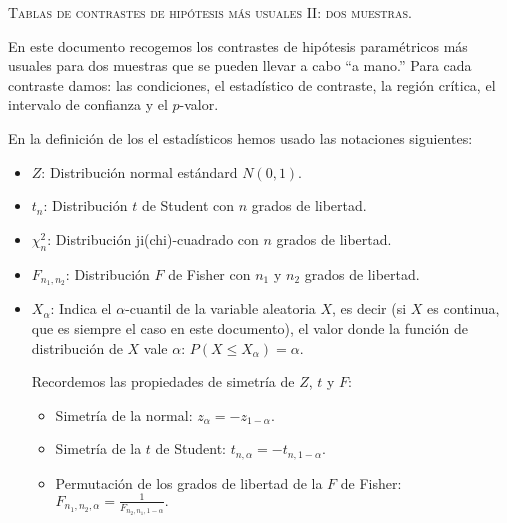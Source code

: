 \documentclass{article}
\begin{document}

\newcommand{\pp}[1]{P(#1\right)}
\newcommand{\vegeu}[1]{{(\footnotesize ver (#1))}}
\renewcommand{\thecas}{\Roman{cas}}
\newcommand{\posacas}{\addtocounter{cas}{1}{\bf \thecas}}


\begin{center}
\textsc{Tablas de contrastes de hipótesis más usuales II: dos muestras.}
\end{center}
\vspace*{2cm}

\noindent En este documento recogemos los contrastes de hipótesis paramétricos más usuales para dos muestras  que se pueden llevar a cabo ``a mano.'' Para cada contraste damos: las condiciones, el estadístico
de contraste, la región crítica, el intervalo de confianza y el $p$-valor.

En la definición de los el estadísticos hemos usado las notaciones siguientes:
\begin{itemize}
\item  $Z$: {Distribución normal estándard $N(0,1)$.} 
\item $t_n$: {Distribución
$t$ de Student con $n$ grados de libertad.} 
\item $\chi_n^2$: {Distribución
ji(chi)-cuadrado con $n$ grados de libertad.} 
\item $F_{n_1,n_2}$: {Distribución $F$ de
Fisher  con $n_1$ y $n_2$ grados de libertad.}
\item $X_\alpha$: Indica el $\alpha$-cuantil de la variable aleatoria $X$, es decir (si $X$ es continua, que es siempre el caso en este documento), el valor donde la
función de distribución de $X$ vale $\alpha$: $P(X\leq X_\alpha
)=\alpha$. 

Recordemos las propiedades de simetría de $Z$, $t$ y $F$:
\begin{itemize}
\item Simetría de la normal: $z_\alpha = -z_{1-\alpha}.$
\item Simetría de la $t$ de Student: $t_{n,\alpha} = -t_{n,1-\alpha}.$
\item Permutación de los grados de libertad de la $F$ de Fisher: $F_{n_1,n_2,\alpha}=\frac{1}{F_{n_2,n_1,1-\alpha}}.$
\end{itemize}
\end{itemize}
\end{document}
